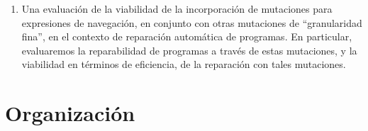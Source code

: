 \begin{enumerate}
    \item Una evaluaci\'on de la viabilidad de la incorporaci\'on de mutaciones para expresiones de navegaci\'on, en conjunto con otras mutaciones de ``granularidad fina'', en el contexto de reparaci\'on autom\'atica de programas. En particular, evaluaremos la reparabilidad de programas a trav\'es de estas mutaciones, y la viabilidad en t\'erminos de eficiencia, de la reparaci\'on con tales mutaciones. 
 
\end{enumerate}



\section{Organizaci\'on}
\label{sec:intro.organizacion}

